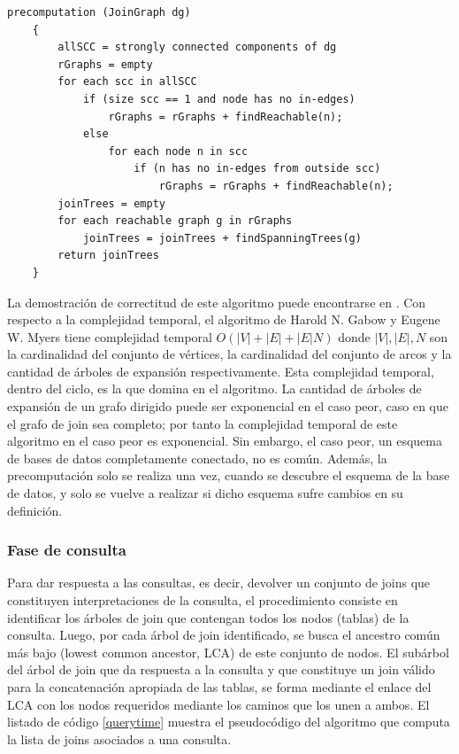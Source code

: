 \begin{lstlisting}[label={precom}, caption={Pseudoc\'odigo del proceso de precomputaci\'on (tomado de \cite{mason2005autojoin})}]
    precomputation (JoinGraph dg)
    {
        allSCC = strongly connected components of dg
        rGraphs = empty
        for each scc in allSCC
            if (size scc == 1 and node has no in-edges)
                rGraphs = rGraphs + findReachable(n);
            else
                for each node n in scc
                    if (n has no in-edges from outside scc)
                        rGraphs = rGraphs + findReachable(n);
        joinTrees = empty
        for each reachable graph g in rGraphs
            joinTrees = joinTrees + findSpanningTrees(g)
        return joinTrees
    }
\end{lstlisting}

La demostración de correctitud de este algoritmo puede encontrarse en 
\cite{mason2005autojoin}. Con respecto a la complejidad temporal, el algoritmo de Harold N. Gabow y 
Eugene W. Myers tiene complejidad temporal $O(|V| + |E| + |E|N)$ donde $|V|, |E|, N$ son la cardinalidad 
del conjunto de vértices, la cardinalidad del conjunto de arcos y la cantidad de \'arboles de expansión respectivamente. 
Esta complejidad temporal, dentro del ciclo, es la que domina en el algoritmo. La cantidad de \'arboles de 
expansión de un grafo dirigido puede ser exponencial en el caso peor, caso en que el grafo de join sea 
completo; por tanto la complejidad temporal de este algoritmo en el caso peor es exponencial. Sin embargo, 
el caso peor, un esquema de bases de datos completamente conectado, no es com\'un. Además, la precomputaci\'on 
solo se realiza una vez, 
cuando se descubre el esquema de la base de datos, y solo se vuelve a realizar si dicho 
esquema sufre cambios en su definición.

\subsubsection{Fase de consulta}

Para dar respuesta a las consultas, es decir, devolver un conjunto de joins que constituyen 
interpretaciones de la consulta, el procedimiento consiste en identificar los \'arboles de join que 
contengan todos los nodos (tablas) de la consulta. Luego, por cada \'arbol de join identificado, 
se busca el ancestro com\'un m\'as bajo (lowest common ancestor, LCA) de este conjunto de nodos. 
El sub\'arbol del \'arbol de join que da respuesta a la consulta y que constituye un join válido 
para la concatenación apropiada de las tablas, se forma mediante el enlace del LCA con los nodos requeridos 
mediante los caminos que los unen a ambos. El listado de código \ref{querytime} muestra el pseudoc\'odigo 
del algoritmo que computa la lista de joins asociados a una consulta.

